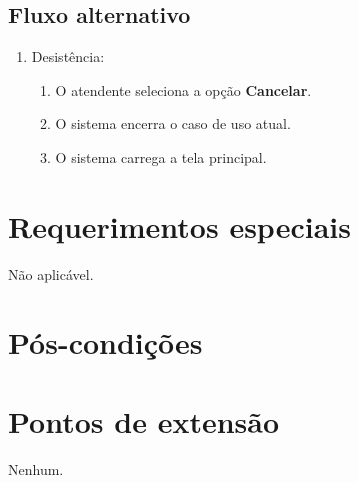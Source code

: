 \subsection{Fluxo alternativo}

\begin{enumerate}
	\item Desistência:
	\begin{enumerate}
		\item O atendente seleciona a opção \textbf{Cancelar}.
		\item O sistema encerra o caso de uso atual.
		\item O sistema carrega a tela principal.
	\end{enumerate}
\end{enumerate}

\section{Requerimentos especiais}

Não aplicável.

\section{Pós-condições}

\section{Pontos de extensão}

Nenhum.